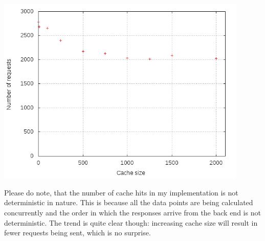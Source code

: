 \documentclass[12pt]{article}
\begin{document}
\includegraphics[width=0.9\textwidth]{cache.png}

Please do note, that the number of cache hits in my implementation is not deterministic in nature. This is because all the data points are being calculated concurrently and the order in which the responses arrive from the back end is not deterministic. The trend is quite clear though: increasing cache size will result in fewer requests being sent, which is no surprise. 
\end{document}
